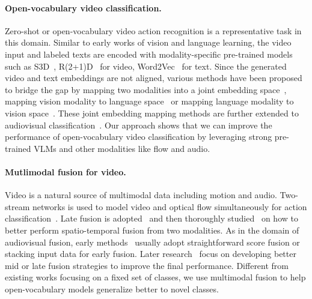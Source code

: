 \documentclass{article}
\begin{document}
\paragraph{Open-vocabulary video classification.} Zero-shot or open-vocabulary video action recognition is a representative task in this domain. 
Similar to early works of vision and language learning, the video input and labeled texts are encoded with modality-specific pre-trained models such as S3D~\cite{xie2018rethinking}, R(2+1)D~\cite{tran2018closer} for video, Word2Vec~\cite{mikolov2013efficient} for text. 
Since the generated video and text embeddings are not aligned, various methods have been proposed to bridge the gap by mapping two modalities into a joint embedding space~\cite{wang2017zero, chen2021elaborative, gao2019know, wu2016harnessing, xu2016multi, zhu2018towards}, mapping vision modality to language space~\cite{bishay2019tarn, brattoli2020rethinking, hahn2019action2vec, xu2017transductive} or mapping language modality to vision space~\cite{mandal2019out, zhang2018visual}.
These joint embedding mapping methods are further extended to audiovisual classification~\cite{mercea2022audio, mazumder2021avgzslnet, parida2020coordinated}.
Our approach shows that we can improve the performance of open-vocabulary video classification by leveraging strong pre-trained VLMs and other modalities like flow and audio.

\paragraph{Mutlimodal fusion for video.} Video is a natural source of multimodal data including motion and audio. Two-stream networks is used to model video and optical flow simultaneously for action classification~\cite{simonyan2014two, wang2016temporal, feichtenhofer2016convolutional, feichtenhofer2017spatiotemporal}. Late fusion is adopted~\cite{simonyan2014two, wang2016temporal} and then thoroughly studied~\cite{feichtenhofer2016convolutional, feichtenhofer2017spatiotemporal} on how to better perform spatio-temporal fusion from two modalities. As in the domain of audiovisual fusion, early methods~\cite{chen1998audio} usually adopt straightforward score fusion or stacking input data for early fusion. Later research~\cite{kazakos2019epic, xiao2020audiovisual, fayek2020large, nagrani2021attention} focus on developing better mid or late fusion strategies to improve the final performance.
Different from existing works focusing on a fixed set of classes, we use multimodal fusion to help open-vocabulary models generalize better to novel classes.
\end{document}
